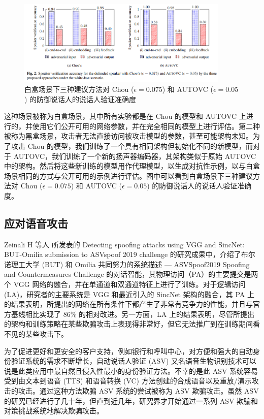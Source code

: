 \begin{figure}[htb]
\centering 
\includegraphics[width=0.90\textwidth]{img/p2m2.png} 
\caption{白盒场景下三种建议方法对 Chou ($\epsilon = 0.075$) 和 AUTOVC ($\epsilon = 0.05$) 的防御说话人的说话人验证准确度}
\label{Test}
\end{figure}

这种场景被称为白盒场景，其中所有实验都是在 Chou 的模型和 AUTOVC 上进行的，并使用它们公开可用的网络参数，并在完全相同的模型上进行评估。第二种被称为黑盒场景，攻击者无法直接访问被攻击模型的参数，甚至可能架构未知。为了攻击 Chou 的模型，我们训练了一个具有相同架构但初始化不同的新模型，而对于 AUTOVC，我们训练了一个新的扬声器编码器，其架构类似于原始 AUTOVC 中的架构。然后将这些新训练的模型用作代理模型，以生成对抗性示例，以与白盒场景相同的方式与公开可用的示例进行评估。图中可以看到白盒场景下三种建议方法对 Chou ($\epsilon = 0.075$) 和 AUTOVC ($\epsilon = 0.05$) 的防御说话人的说话人验证准确度。

\subsection{应对语音攻击}

Zeinali H 等人 \cite{zeinali2019detecting} 所发表的 Detecting spoofing attacks using VGG and SincNet: BUT-Omilia submission to ASVspoof 2019 challenge 的研究成果中，介绍了布尔诺理工大学 (BUT) 和 Omilia 共同努力的系统描述 — ASVSpoof2019 Spoofing and Countermeasures Challenge 的对话智能，其物理访问（PA）的主要提交是两个 VGG 网络的融合，并在单通道和双通道特征上进行了训练。对于逻辑访问 (LA)，研究者的主要系统是 VGG 和最近引入的 SincNet 架构的融合，其 PA 上的结果表明，所提出的网络在所有条件下都产生了非常有竞争力的性能，并且与官方基线相比实现了 86\% 的相对改进。另一方面，LA 上的结果表明，尽管所提出的架构和训练策略在某些欺骗攻击上表现得非常好，但它无法推广到在训练期间看不见的某些攻击下。

为了促进更好和更安全的客户支持，例如银行和呼叫中心，对方便和强大的自动身份验证系统的需求不断增长，自动说话人验证 (ASV) 又名语音生物识别技术可以说是此类应用中最自然且侵入性最小的身份验证方法。不幸的是此 ASV 系统容易受到由文本到语音 (TTS) 和语音转换 (VC) 方法创建的合成语音以及重放/演示攻击的攻击。通过这种方法欺骗 ASV 系统的尝试被称为 ASV 欺骗攻击。虽然 ASV 的研究已经进行了几十年，但直到近几年，研究界才开始通过一系列 ASV 欺骗和对策挑战系统地解决欺骗攻击。

